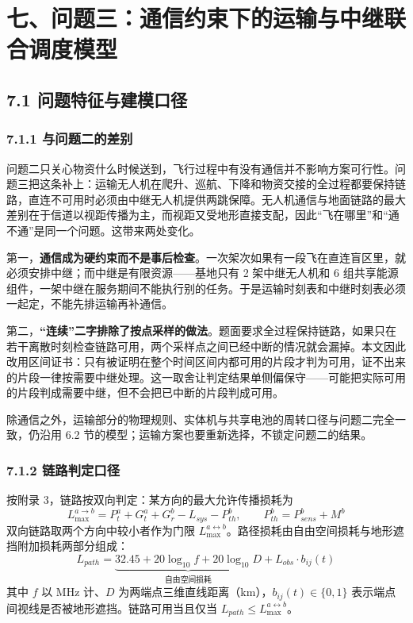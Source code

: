 \documentclass[withoutpreface,bwprint]{format}
\begin{document}
\clearpage
\section{七、问题三：通信约束下的运输与中继联合调度模型}

\subsection{7.1 问题特征与建模口径}

\subsubsection{7.1.1 与问题二的差别}
问题二只关心物资什么时候送到，飞行过程中有没有通信并不影响方案可行性。问题三把这条补上：运输无人机在爬升、巡航、下降和物资交接的全过程都要保持链路，直连不可用时必须由中继无人机提供两跳保障。无人机通信与地面链路的最大差别在于信道以视距传播为主，而视距又受地形直接支配，因此“飞在哪里”和“通不通”是同一个问题\cite{zeng2016}。这带来两处变化。

第一，\textbf{通信成为硬约束而不是事后检查}。一次架次如果有一段飞在直连盲区里，就必须安排中继；而中继是有限资源——基地只有 2 架中继无人机和 6 组共享能源组件，一架中继在服务期间不能执行别的任务。于是运输时刻表和中继时刻表必须一起定，不能先排运输再补通信。

第二，\textbf{“连续”二字排除了按点采样的做法}。题面要求全过程保持链路，如果只在若干离散时刻检查链路可用，两个采样点之间已经中断的情况就会漏掉。本文因此改用区间证书：只有被证明在整个时间区间内都可用的片段才判为可用，证不出来的片段一律按需要中继处理。这一取舍让判定结果单侧偏保守——可能把实际可用的片段判成需要中继，但不会把已中断的片段判成可用。

除通信之外，运输部分的物理规则、实体机与共享电池的周转口径与问题二完全一致，仍沿用 6.2 节的模型；运输方案也要重新选择，不锁定问题二的结果。

\subsubsection{7.1.2 链路判定口径}
按附录 3，链路按双向判定：某方向的最大允许传播损耗为
\begin{equation}
L_{\max}^{a \to b} = P_t^{a} + G_t^{a} + G_r^{b} - L_{sys} - P_{th}^{b}, \qquad P_{th}^{b} = P_{sens}^{b} + M^{b}
\end{equation}
双向链路取两个方向中较小者作为门限 $L_{\max}^{a \leftrightarrow b}$。路径损耗由自由空间损耗与地形遮挡附加损耗两部分组成：
\begin{equation}
L_{path} = \underbrace{32.45 + 20\log_{10} f + 20\log_{10} D}_{\text{自由空间损耗}} + L_{obs}\cdot b_{ij}(t)
\end{equation}
其中 $f$ 以 MHz 计、$D$ 为两端点三维直线距离（km），$b_{ij}(t)\in\{0,1\}$ 表示端点间视线是否被地形遮挡。链路可用当且仅当 $L_{path} \le L_{\max}^{a \leftrightarrow b}$。
\end{document}
